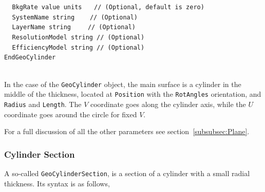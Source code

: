 $~~~~~${\tt BkgRate          value units                       $~~~$   // (Optional, default is zero)} \\
$~~~~~${\tt SystemName       string                          $~~~~~$   // (Optional)} \\
$~~~~~${\tt LayerName        string                         $~~~~~~$   // (Optional)} \\
$~~~~~${\tt ResolutionModel  string                                    // (Optional)} \\
$~~~~~${\tt EfficiencyModel  string                                    // (Optional)} \\
{\tt EndGeoCylinder}

~\\
In the case of the {\tt GeoCylinder} object, the main surface is a cylinder in the middle of the thickness, located 
at {\tt Position} with the {\tt RotAngles} orientation, and {\tt Radius} and {\tt Length}. The $V$ coordinate goes 
along the cylinder axis, while the $U$ coordinate goes around the circle for fixed $V$.

For a full discussion of all the other parameters see section~\ref{subsubsec:Plane}.


\subsubsection{Cylinder Section}

A so-called {\tt GeoCylinderSection}, is a section of a cylinder with a small radial thickness. Its syntax is as follows,

